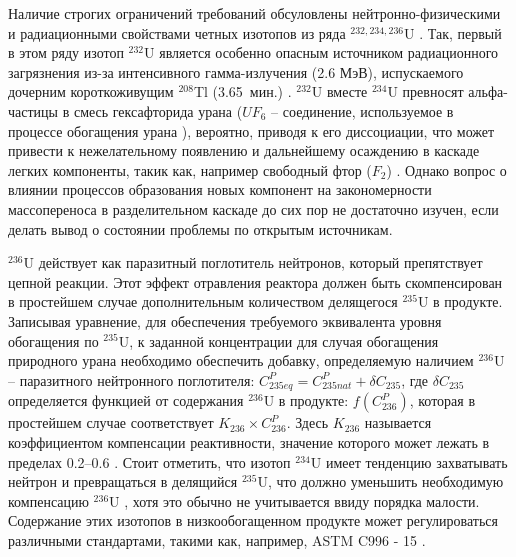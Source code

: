 Наличие строгих ограничений требований обсуловлены нейтронно-физическими и радиационными свойствами четных изотопов из ряда $^{232,234,236}$U \cite{smirnovEvolutionIsotopicComposition2012, proselkovAnalizVozmozhnostiIspolzovaniya2003, dudnikovInfluence236UEfficacy2016}. Так, первый в этом ряду изотоп $^{232}$U является особенно опасным источником радиационного загрязнения из-за интенсивного гамма-излучения (2.6 МэВ), испускаемого дочерним короткоживущим $^{208}$Tl (3.65 мин.) \cite{matveevUran232EgoVliyanie1985,abbasProliferationResistanceFeatures2013}.
$^{232}$U вместе $^{234}$U превносят альфа-частицы в смесь гексафторида урана ($UF_6$ -- соединение, используемое в процессе обогащения урана \cite{orlovWayObtainUranium2015, orlovDesublimationPurificationTransporting2017}), вероятно, приводя к его диссоциации, что может привести к нежелательному появлению и дальнейшему осаждению в каскаде легких компоненты, такик как, например свободный фтор ($F_2$) \cite{kryuchkovObogashchennyyUranDobavleniem2007, bernhardtRadiationEffectsAlpha1958, shmelevRazrabotkaRaschetnoyModeli2012}. Однако вопрос о влиянии процессов образования новых компонент на закономерности массопереноса в разделительном каскаде до сих пор не достаточно изучен, если делать вывод о состоянии проблемы по открытым источникам.

$^{236}$U действует как паразитный поглотитель нейтронов, который препятствует цепной реакции. Этот эффект отравления реактора должен быть скомпенсирован в простейшем случае дополнительным количеством делящегося $^{235}$U в продукте. Записывая уравнение, для обеспечения требуемого эквивалента уровня обогащения по $^{235}$U, к заданной концентрации для случая обогащения природного урана необходимо обеспечить добавку, определяемую наличием $^{236}$U -- паразитного нейтронного поглотителя:
$C_{235 e q}^{P}=C_{235 n a t}^{P}+\delta C_{235}$, где $\delta C_{235}$ определяется функцией от содержания $^{236}$U в продукте:
$f\left(C_{236}^{P}\right)$, которая в простейшем случае соответствует $K_{236} \times C_{236}^{P}$. Здесь $K_{236}$ называется коэффициентом компенсации реактивности, значение которого может лежать в пределах 0.2--0.6 \cite{delagarzaMulticomponentIsotopeSeparation1961, delculAnalysisReuseUranium2009}. Стоит отметить, что изотоп $^{234}$U имеет тенденцию захватывать нейтрон и превращаться в делящийся $^{235}$U, что должно уменьшить необходимую компенсацию $^{236}$U \cite{dyachenkoIspolzovanieRegenerirovannogoUrana2012}, хотя это обычно не учитывается ввиду порядка малости. Содержание этих изотопов в низкообогащенном продукте может регулироваться различными стандартами, такими как, например, ASTM C996 - 15 \cite{c26committeeSpecificationUraniumHexafluoride}.

